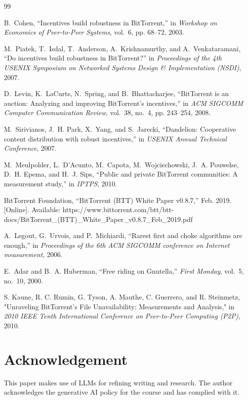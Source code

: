 \documentclass[12pt]{article}
\begin{document}
\newpage
\begin{thebibliography}{99}

B.~Cohen, ``Incentives build robustness in BitTorrent,'' in \emph{Workshop on Economics of Peer-to-Peer Systems}, vol.~6, pp. 68--72, 2003.

M.~Piatek, T.~Isdal, T.~Anderson, A.~Krishnamurthy, and A.~Venkataramani, ``Do incentives build robustness in BitTorrent?'' in \emph{Proceedings of the 4th USENIX Symposium on Networked Systems Design \& Implementation (NSDI)}, 2007.

D.~Levin, K.~LaCurts, N.~Spring, and B.~Bhattacharjee, ``BitTorrent is an auction: Analyzing and improving BitTorrent's incentives,'' in \emph{ACM SIGCOMM Computer Communication Review}, vol.~38, no.~4, pp. 243--254, 2008.

M.~Sirivianos, J.~H. Park, X.~Yang, and S.~Jarecki, ``Dandelion: Cooperative content distribution with robust incentives,'' in \emph{USENIX Annual Technical Conference}, 2007.

M.~Meulpolder, L.~D'Acunto, M.~Capota, M.~Wojciechowski, J.~A. Pouwelse, D.~H. Epema, and H.~J. Sips, ``Public and private BitTorrent communities: A measurement study,'' in \emph{IPTPS}, 2010.

BitTorrent Foundation, ``BitTorrent (BTT) White Paper v0.8.7,'' Feb. 2019. [Online]. Available: https://www.bittorrent.com/btt/btt-docs/BitTorrent\_(BTT)\_White\_Paper\_v0.8.7\_Feb\_2019.pdf

A.~Legout, G.~Urvois, and P.~Michiardi, ``Rarest first and choke algorithms are enough,'' in \emph{Proceedings of the 6th ACM SIGCOMM conference on Internet measurement}, 2006.

E.~Adar and B.~A. Huberman, ``Free riding on Gnutella,'' \emph{First Monday}, vol.~5, no.~10, 2000.

S. Kaune, R. C. Rumin, G. Tyson, A. Mauthe, C. Guerrero, and R. Steinmetz, "Unraveling BitTorrent's File Unavailability: Measurements and Analysis," in \emph{2010 IEEE Tenth International Conference on Peer-to-Peer Computing (P2P)}, 2010.

\end{thebibliography}

\section*{Acknowledgement}
This paper makes use of LLMs for refining writing and research. The author acknowledges the generative AI policy for the course and has complied with it.
\end{document}
